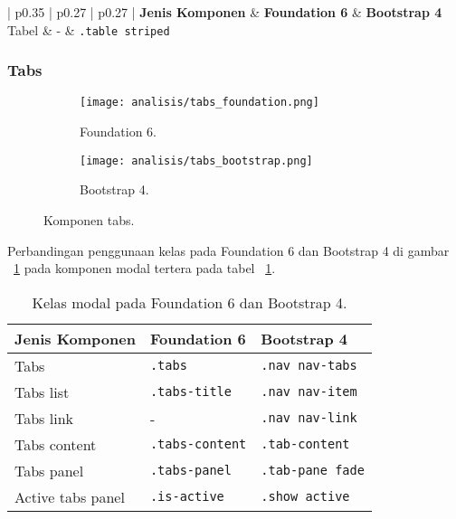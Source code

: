 \begin{table}[H] 
	\caption{Kelas modal pada Foundation 6 dan Bootstrap 4.}
	\begin{tabular}{| p{0.35\textwidth} | p{0.27\textwidth} | p{0.27\textwidth} |} 
		\hline
		\textbf{Jenis Komponen} & \textbf{Foundation 6} & \textbf{Bootstrap 4}  \\ [0.5ex] 
		\hline	
		Tabel & - & \texttt{.table striped}\\[1ex]	
		\hline		
	\end{tabular}
	\label{table:tabel}
\end{table}

\subsubsection{Tabs}
\begin{figure} [H]	
	\centering
	\begin{subfigure}[b]{0.45\linewidth}   
		\texttt{[image: analisis/tabs\_foundation.png]}
		\caption{Foundation 6.} 
	\end{subfigure}
	\begin{subfigure}[b]{0.45\linewidth} 
		\texttt{[image: analisis/tabs\_bootstrap.png]}
		\caption{Bootstrap 4.} 
	\end{subfigure}
	\caption{Komponen tabs.}
	\label{fig:tabs}
\end{figure}

\noindent Perbandingan penggunaan kelas pada Foundation 6 dan Bootstrap 4 di gambar ~\ref{fig:tabs} pada komponen modal tertera pada tabel ~\ref{table:tabs}.\\

\begin{table}[H] 
	\caption{Kelas modal pada Foundation 6 dan Bootstrap 4.}
	\begin{tabular}{| p{} | p{} | p{} |} 
		\hline
		\textbf{Jenis Komponen} & \textbf{Foundation 6} & \textbf{Bootstrap 4}  \\ [0.5ex] 
		\hline	
		Tabs & \texttt{.tabs} & \texttt{.nav nav-tabs}\\	
		\hline
		Tabs list & \texttt{.tabs-title} & \texttt{.nav nav-item}\\	
		\hline
		Tabs link & - & \texttt{.nav nav-link}\\[1ex]	
		\hline	
		Tabs content & \texttt{.tabs-content} & \texttt{.tab-content}\\[1ex]	
		\hline			
		Tabs panel & \texttt{.tabs-panel} & \texttt{.tab-pane fade}\\[1ex]	
		\hline
		Active tabs panel & \texttt{.is-active} & \texttt{.show active}\\[1ex]	
		\hline	
	\end{tabular}
	\label{table:tabs}
\end{table}

 
